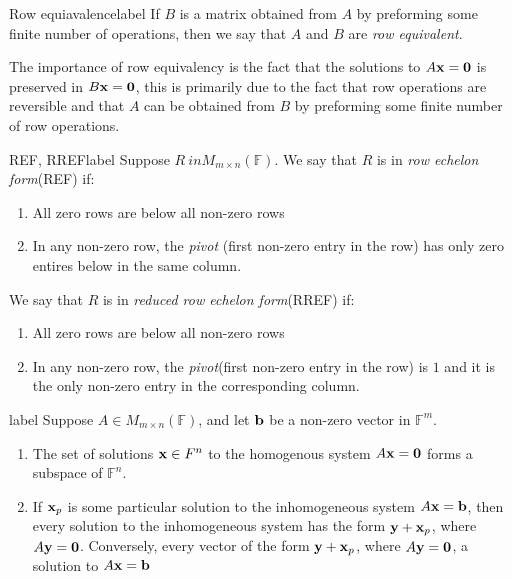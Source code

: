 \documentclass[12pt]{article}
\theoremstyle{definition}
\newcommand{\F}{\ensuremath{\mathbb{F}}}
\begin{document}
\begin{definition}{Row equiavalence}{label}
  If $B$ is a matrix obtained from $A$ by preforming some finite number of operations, then we say that $A$ and $B$ are \emph{row equivalent}. 
\end{definition}
The importance of row equivalency is the fact that the solutions to $A\vb x = \vb 0$ is preserved in $B\vb x = \vb 0$, this is primarily due to the fact that row operations are reversible and that $A$ can be obtained from $B$ by preforming some finite number of row operations.
\begin{definition}{REF, RREF}{label}
  Suppose $R\ in M_{m\times n}(\F)$. We say that $R$ is in \emph{row echelon form}(REF) if:
  \begin{enumerate}
    \item All zero rows are below all non-zero rows
    \item In any non-zero row, the \emph{pivot} (first non-zero entry in the row) has only zero entires below in the same column.
  \end{enumerate}
  We say that $R$ is in \emph{reduced row echelon form}(RREF) if:
  \begin{enumerate}
    \item All zero rows are below all non-zero rows
    \item In any non-zero row, the \emph{pivot}(first non-zero entry in the row) is $1$ and it is the only non-zero entry in the corresponding column. 
  \end{enumerate}
  
\end{definition}


\begin{theorem}{}{label}
  Suppose $A \in M_{m\times n}(\F)$, and let $\vb b$ be a non-zero vector in $\F^m$.
  \begin{enumerate}
    \item The set of solutions $\vb x\in F^n$ to the homogenous system $A\vb x = \vb 0$ forms a subspace of $\F^n$.
    \item If $\vb x_p$ is some particular solution to the inhomogeneous system $A\vb x = \vb b$, then every solution to the inhomogeneous system has the form $\vb y + \vb x_p$, where $A\vb y = \vb 0$. Conversely, every vector of the form $\vb y + \vb x_p$, where $A\vb y = \vb 0$, a solution to $A\vb x = \vb b$ 
  \end{enumerate}
\end{theorem}
\end{document}

